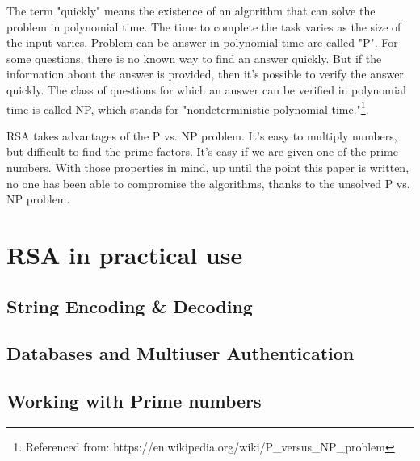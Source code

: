 \documentclass[]{article}
\begin{document}
The term "quickly" means the existence of an algorithm that can solve the problem in polynomial time. The time to complete the task varies as the size of the input varies. Problem can be answer in polynomial time are called "P". For some questions, there is no known way to find an answer quickly. But if the information about the answer is provided, then it's possible to verify the answer quickly. The class of questions for which an answer can be verified in polynomial time is called NP, which stands for "nondeterministic polynomial time."\footnote{Referenced from: https://en.wikipedia.org/wiki/P\_versus\_NP\_problem}.

RSA takes advantages of the P vs. NP problem. It's easy to multiply numbers, but difficult to find the prime factors. It's easy if we are given one of the prime numbers. With those properties in mind, up until the point this paper is written, no one has been able to compromise the algorithms, thanks to the unsolved P vs. NP problem. 

\section{RSA in practical use}

\subsection{String Encoding \&  Decoding}

\subsection{Databases and Multiuser Authentication}

\subsection{Working with Prime numbers}
\end{document}
